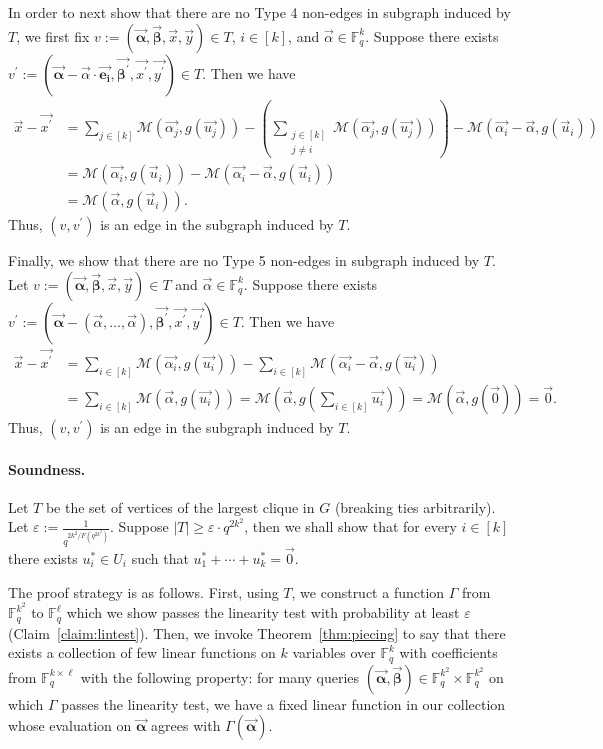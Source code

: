 \documentclass[10pt,a4paper]{article}
\newcommand{\F}{\mathbb{F}}
\renewcommand{\ge}{ \geqslant}
\newcommand{\alphab}{\vec{\bm{\alpha}}}
\newcommand{\betab}{\vec{\bm{\beta}}}
\newcommand{\M}{\mathcal{M}}
\begin{document}
In order to next show that there are no Type 4 non-edges in subgraph induced by $T$, we first fix $v:=(\alphab,\betab,\vec{x},\vec{y})\in T$, $i\in [k]$, and $\vec{\alpha}\in \F_q^k$. Suppose there exists $v^{\prime}:=(\alphab-\vec{\alpha}\cdot \vec{\bm{e_i}},\vec{\bm{\beta^{\prime}}},\vec{x^{\prime}},\vec{y^{\prime}})\in T$. Then we have 
\begin{align*}
\vec{x}-\vec{x^{\prime}}&=\sum_{j\in[k]} \M(\vec{\alpha_j},g(\vec{u_j}))-\left(\sum_{\substack{j\in[k]\\j\neq i}} \M(\vec{\alpha_j},g(\vec{u_j}))\right)-\M(\vec{\alpha_i}-\vec{\alpha},g(\vec{u}_i))\\
&=\M(\vec{\alpha_i},g(\vec{u}_i))-\M(\vec{\alpha_i}-\vec{\alpha},g(\vec{u}_i))\\
&=\M(\vec{\alpha},g(\vec{u}_i)).
\end{align*} 
Thus, $(v,v^{\prime})$ is an edge in the subgraph induced by $T$. 

Finally, we show that there are no Type 5 non-edges in subgraph induced by $T$. Let $v:=(\alphab,\betab,\vec{x},\vec{y})\in T$ and $\vec{\alpha}\in \F_q^k$. Suppose there exists $v^{\prime}:=(\alphab-(\vec{\alpha},\ldots ,\vec{\alpha}),\vec{\bm{\beta^{\prime}}},\vec{x^{\prime}},\vec{y^{\prime}})\in T$. Then we have 
\begin{align*}
\vec{x}-\vec{x^{\prime}}&=\sum_{i\in[k]} \M(\vec{\alpha_i},g(\vec{u_i}))-\sum_{i\in[k]} \M(\vec{\alpha_i}-\vec{\alpha},g(\vec{u_i}))\\
&=\sum_{i\in[k]} \M(\vec{\alpha},g(\vec{u_i}))
= \M\left(\vec{\alpha},g\left(\sum_{i\in[k]}\vec{u_i}\right)\right)
= \M(\vec{\alpha},g(\vec{0}))
= \vec{0}.
\end{align*} 
Thus, $(v,v^{\prime})$ is an edge in the subgraph induced by $T$. 

\paragraph{Soundness.}
Let $T$ be the set of vertices of the largest clique in $G$ (breaking ties arbitrarily). 
Let $\varepsilon:=\frac{1}{q^{{2k^2}/{F\left(q^{2k^2}\right)}}}$. 
Suppose  $|T|\ge \varepsilon\cdot q^{2k^2}$, then we shall show that for every $i\in[k]$ there exists $u_i^\ast\in U_i$ such that $u_1^\ast+\cdots +u_k^\ast=\vec{0}$.    
 


The proof strategy is as follows. First, using $T$, we construct a function $\Gamma$ from $\F_q^{k^2}$ to $\F_q^\ell$ which we show passes the linearity test with probability at least $\varepsilon$ (Claim~\ref{claim:lintest}). Then, we invoke Theorem~\ref{thm:piecing} to say that there exists a collection of few linear functions on $k$ variables over $\F_q^k$ with coefficients from $\F_q^{k\times \ell}$ with the following property: for many queries $(\vec{\bm \alpha},\vec{\bm\beta})\in \F_q^{ k^2}\times \F_q^{ k^2}$ on which $\Gamma$ passes the linearity test, we have   a fixed linear function in our collection whose evaluation on $\vec{\bm\alpha}$ agrees with  $\Gamma(\vec{\bm\alpha})$.
\end{document}

